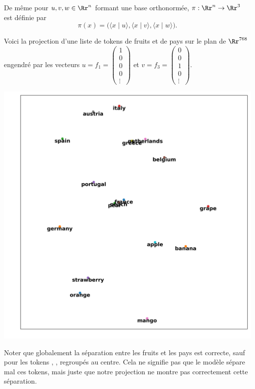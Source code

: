 \documentclass[11pt,class=report,crop=false]{standalone}
\begin{document}


De même pour $u,v,w \in \Rr^n$ formant une base orthonormée, $\pi : \Rr^n \to \Rr^3$ est définie par 
$$\pi(x) = \big(\langle x \mid u \rangle, \langle x \mid v \rangle, \langle x \mid w \rangle\big).$$

\begin{exemple}
Voici la projection d'une liste de tokens de fruits et de pays sur le plan de $\Rr^{768}$ engendré par les vecteurs $u = f_1 = \left(\begin{smallmatrix}1 \\ 0 \\ 0 \\ 0 \\ \vdots \end{smallmatrix}\right)$ et $v = f_3 =  \left(\begin{smallmatrix}0 \\ 0 \\ 1 \\ 0 \\\vdots \end{smallmatrix}\right)$.


\begin{center}
	\includegraphics[scale=\myscale,scale=0.3]{figures/projection-plan}
\end{center}

Noter que globalement la séparation entre les fruits et les pays est correcte, sauf pour les tokens , ,  regroupés au centre.
Cela ne signifie pas que le modèle sépare mal ces tokens, mais juste que notre projection ne montre pas correctement cette séparation.
\end{exemple}
\end{document}
